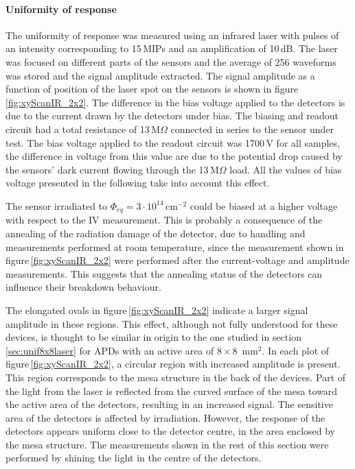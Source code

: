 \documentclass[3p,preprint,twocolumn]{elsarticle}
\begin{document}
\paragraph{Uniformity of response}
The uniformity of response was measured using an infrared laser with pulses of an intensity corresponding to 15\,MIPs and an amplification of 10\,dB.
The laser was focused on different parts of the sensors and the average of 256 waveforms was stored and the signal amplitude extracted.
The signal amplitude as a function of position of the laser spot on the sensors is shown in figure\,\ref{fig:xyScanIR_2x2}.
The difference in the bias voltage applied to the detectors is due to the current drawn by the detectors under bias.
The biasing and readout circuit had a total resistance of 13\,M$\Omega$ connected in series to the sensor under test.
The bias voltage applied to the readout circuit was 1700\,V for all samples, the difference in voltage from this value are due to the potential drop caused by the sensors' dark current flowing through the 13\,M$\Omega$ load.
All the values of bias voltage presented in the following take into account this effect.

The sensor irradiated to $\Phi_{eq} = 3 \cdot 10^{14}$\,cm$^{-2}$ could be biased at a higher voltage with respect to the IV measurement.
This is probably a consequence of the annealing of the radiation damage of the detector, due to handling and measurements performed at room temperature, since the measurement shown in figure\,\ref{fig:xyScanIR_2x2} were performed after the current-voltage and amplitude measurements.
This suggests that the annealing status of the detectors can influence their breakdown behaviour.

The elongated ovals in figure\,\ref{fig:xyScanIR_2x2} indicate a larger signal amplitude in these regions.
This effect, although not fully understood for these devices, is thought to be similar in origin to the one studied in section\,\ref{sec:unif8x8laser} for APDs with an active area of $8 \times 8$~mm$^2$.
In each plot of figure\,\ref{fig:xyScanIR_2x2}, a circular region with increased amplitude is present.
This region corresponds to the mesa structure in the back of the devices.
Part of the light from the laser is reflected from the curved surface of the mesa toward the active area of the detectors, resulting in an increased signal.
The sensitive area of the detectors is affected by irradiation.
However, the response of the detectors appears uniform close to the detector centre, in the area enclosed by the mesa structure.
The measurements shown in the rest of this section were performed by shining the light in the centre of the detectors.
\end{document}
